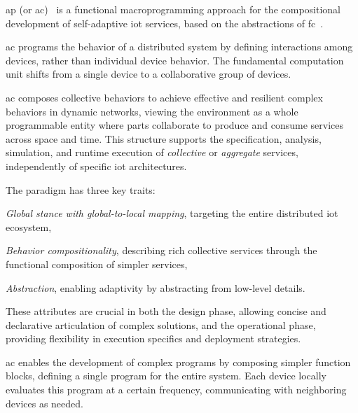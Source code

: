 \documentclass[12pt, a4paper]{article}
\newenvironment{inlinelist}{\begin{enumerate*}[label=\emph{(\roman*)}]}{\end{enumerate*}}
\begin{document}
\ac{ap} (or \ac{ac})~\cite{CASADEI2019252} is a functional macroprogramming approach for the compositional development
of self-adaptive \ac{iot} services,
based on the abstractions of \ac{fc}~\cite{MAMEIZL04}.

\ac{ac} programs the behavior of a distributed system by defining interactions among devices,
rather than individual device behavior.
%
The fundamental computation unit shifts from a single device to a collaborative group of devices.

\ac{ac} composes collective behaviors to achieve effective and resilient complex behaviors in dynamic networks,
viewing the environment as a whole programmable entity where parts collaborate to produce and consume services across space and time.
%
This structure supports the specification, analysis, simulation, and runtime execution of \emph{collective} or \emph{aggregate} services,
independently of specific \ac{iot} architectures.

The paradigm has three key traits:
\begin{inlinelist}
    \item \emph{Global stance with global-to-local mapping}, targeting the entire distributed \ac{iot} ecosystem,
    \item \emph{Behavior compositionality}, describing rich collective services through the functional composition of simpler services,
    \item \emph{Abstraction}, enabling adaptivity by abstracting from low-level details.
\end{inlinelist}
%
These attributes are crucial in both the design phase, allowing concise and declarative articulation of complex solutions,
and the operational phase, providing flexibility in execution specifics and deployment strategies.

\ac{ac} enables the development of complex programs by composing simpler function blocks, defining a single program for
the entire system.
%
Each device locally evaluates this program at a certain frequency, communicating with neighboring devices as needed.
\end{document}
